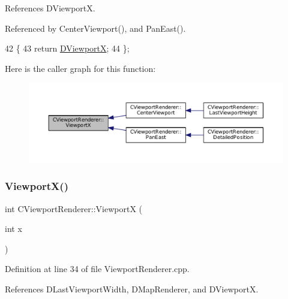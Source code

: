 References D\+ViewportX.



Referenced by Center\+Viewport(), and Pan\+East().


\begin{DoxyCode}
42                              \{
43             \textcolor{keywordflow}{return} \hyperlink{classCViewportRenderer_aea9e05347f71a8e6b83439aab653be18}{DViewportX};  
44         \};
\end{DoxyCode}
Here is the caller graph for this function\+:\nopagebreak
\begin{figure}[H]
\begin{center}
\leavevmode
\includegraphics[width=350pt]{classCViewportRenderer_adf6c09ee00cdbf0803e72d59bff9a235_icgraph}
\end{center}
\end{figure}
\hypertarget{classCViewportRenderer_ac81f563649d991e03cc0f35a86dda296}{}\label{classCViewportRenderer_ac81f563649d991e03cc0f35a86dda296} 
\subsubsection{\texorpdfstring{Viewport\+X()}{ViewportX()}\hspace{0.1cm}{\footnotesize\ttfamily [2/2]}}
{\footnotesize\ttfamily int C\+Viewport\+Renderer\+::\+ViewportX (\begin{DoxyParamCaption}\item[{int}]{x }\end{DoxyParamCaption})}



Definition at line 34 of file Viewport\+Renderer.\+cpp.



References D\+Last\+Viewport\+Width, D\+Map\+Renderer, and D\+ViewportX.


